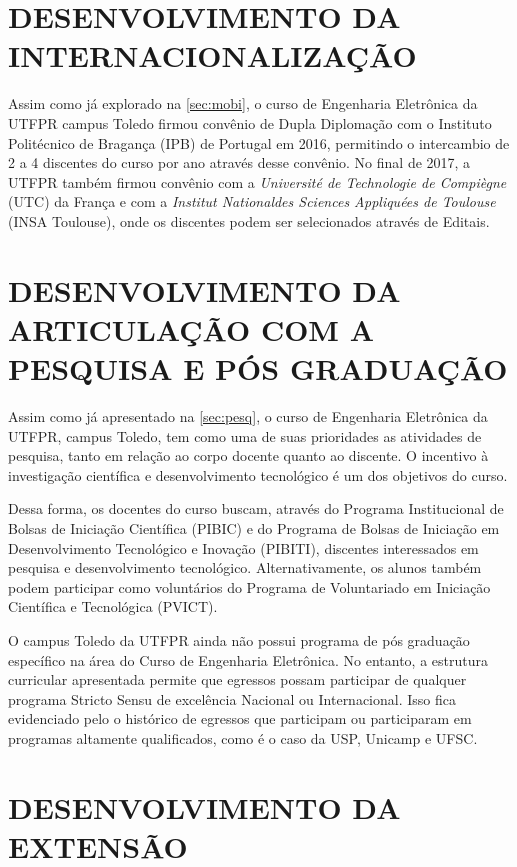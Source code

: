 \section{DESENVOLVIMENTO DA INTERNACIONALIZAÇÃO}

Assim como já explorado na \autoref{sec:mobi}, o curso de Engenharia Eletrônica da UTFPR campus Toledo firmou convênio de Dupla Diplomação com o Instituto Politécnico de Bragança (IPB) de Portugal em 2016, permitindo o intercambio de 2 a 4 discentes do curso por ano através desse convênio. No final de 2017, a UTFPR também firmou convênio com a \textit{Université de Technologie de Compiègne} (UTC) da França e com a \textit{Institut Nationaldes Sciences Appliquées de Toulouse} (INSA Toulouse), onde os discentes podem ser selecionados através de Editais.

\section{DESENVOLVIMENTO DA ARTICULAÇÃO COM A PESQUISA E PÓS GRADUAÇÃO}

Assim como já apresentado na \autoref{sec:pesq}, o curso de Engenharia Eletrônica da UTFPR, campus Toledo, tem como uma de suas prioridades as atividades de pesquisa, tanto em relação ao corpo docente quanto ao discente. O incentivo à investigação científica e desenvolvimento tecnológico é um dos objetivos do curso.

Dessa forma, os docentes do curso buscam, através do Programa Institucional de Bolsas de Iniciação Científica (PIBIC) e do Programa de Bolsas de Iniciação em Desenvolvimento Tecnológico e Inovação (PIBITI), discentes interessados em pesquisa e desenvolvimento tecnológico. Alternativamente, os alunos também podem participar como voluntários do Programa de Voluntariado em Iniciação Científica e Tecnológica (PVICT).

O campus Toledo da UTFPR ainda não possui programa de pós graduação específico na área do Curso de Engenharia Eletrônica. No entanto, a estrutura curricular apresentada permite que egressos possam participar de qualquer programa Stricto Sensu de excelência Nacional ou Internacional. Isso fica evidenciado pelo o histórico de egressos que participam ou participaram em programas altamente qualificados, como é o caso da USP, Unicamp e UFSC.

\section{DESENVOLVIMENTO DA EXTENSÃO}


